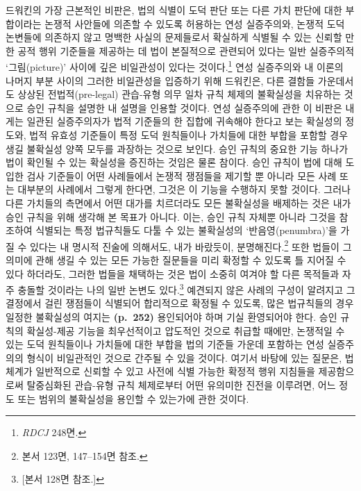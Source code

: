 드워킨의 가장 근본적인 비판은, 법의 식별이 도덕 판단 또는 다른 가치
판단에 대한 부합이라는 논쟁적 사안들에 의존할 수 있도록 허용하는 연성
실증주의와, 논쟁적 도덕 논변들에 의존하지 않고 명백한 사실의 문제들로서
확실하게 식별될 수 있는 신뢰할 만한 공적 행위 기준들을 제공하는 데 법이
본질적으로 관련되어 있다는 일반 실증주의적 ‘그림(picture)’ 사이에 깊은
비일관성이 있다는 것이다.\footnote{\emph{RDCJ} 248면.} 연성 실증주의와
내 이론의 나머지 부분 사이의 그러한 비일관성을 입증하기 위해 드워킨은,
다른 결함들 가운데서도 상상된 전법적(pre-legal) 관습-유형 의무 일차 규칙
체제의 불확실성을 치유하는 것으로 승인 규칙을 설명한 내 설명을 인용할
것이다. 연성 실증주의에 관한 이 비판은 내게는 일관된 실증주의자가 법적
기준들의 한 집합에 귀속해야 한다고 보는 확실성의 정도와, 법적 유효성
기준들이 특정 도덕 원칙들이나 가치들에 대한 부합을 포함할 경우 생길
불확실성 양쪽 모두를 과장하는 것으로 보인다. 승인 규칙의 중요한 기능
하나가 법이 확인될 수 있는 확실성을 증진하는 것임은 물론 참이다. 승인
규칙이 법에 대해 도입한 검사 기준들이 어떤 사례들에서 논쟁적 쟁점들을
제기할 뿐 아니라 모든 사례 또는 대부분의 사례에서 그렇게 한다면, 그것은
이 기능을 수행하지 못할 것이다. 그러나 다른 가치들의 측면에서 어떤
대가를 치르더라도 모든 불확실성을 배제하는 것은 내가 승인 규칙을 위해
생각해 본 목표가 아니다. 이는, 승인 규칙 자체뿐 아니라 그것을 참조하여
식별되는 특정 법규칙들도 다툴 수 있는 불확실성의 ‘반음영(penumbra)’을
가질 수 있다는 내 명시적 진술에 의해서도, 내가 바랐듯이,
분명해진다.\footnote{본서 123면, 147--154면 참조.} 또한 법들이 그 의미에
관해 생길 수 있는 모든 가능한 질문들을 미리 확정할 수 있도록 틀 지어질
수 있다 하더라도, 그러한 법들을 채택하는 것은 법이 소중히 여겨야 할 다른
목적들과 자주 충돌할 것이라는 나의 일반 논변도 있다.\footnote{{[}본서
  128면 참조.{]}} 예견되지 않은 사례의 구성이 알려지고 그 결정에서 걸린
쟁점들이 식별되어 합리적으로 확정될 수 있도록, 많은 법규칙들의 경우
일정한 불확실성의 여지는 \textbf{(p.~252)} 용인되어야 하며 기실
환영되어야 한다. 승인 규칙의 확실성-제공 기능을 최우선적이고 압도적인
것으로 취급할 때에만, 논쟁적일 수 있는 도덕 원칙들이나 가치들에 대한
부합을 법의 기준들 가운데 포함하는 연성 실증주의의 형식이 비일관적인
것으로 간주될 수 있을 것이다. 여기서 바탕에 있는 질문은, 법체계가
일반적으로 신뢰할 수 있고 사전에 식별 가능한 확정적 행위 지침들을
제공함으로써 탈중심화된 관습-유형 규칙 체제로부터 어떤 유의미한 진전을
이루려면, 어느 정도 또는 범위의 불확실성을 용인할 수 있는가에 관한
것이다.

